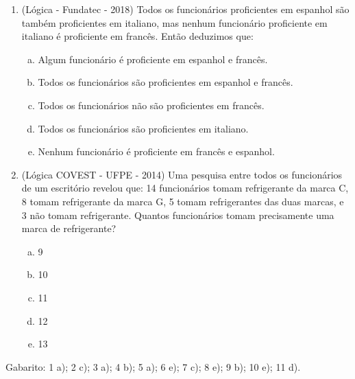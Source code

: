\begin{enumerate}
\item (Lógica - Fundatec - 2018) Todos os funcionários proficientes em espanhol são também proficientes em italiano, mas nenhum funcionário proficiente em italiano é proficiente em francês. Então deduzimos que:
\begin{enumerate}[a)]
\item Algum funcionário é proficiente em espanhol e francês.
\item Todos os funcionários são proficientes em espanhol e francês.
\item Todos os funcionários não são proficientes em francês.
\item Todos os funcionários são proficientes em italiano.
\item Nenhum funcionário é proficiente em francês e espanhol.
\end{enumerate}

\item (Lógica COVEST - UFPE - 2014)  Uma pesquisa entre todos os funcionários de um escritório revelou que: 14 funcionários tomam refrigerante da marca C, 8 tomam refrigerante da marca G, 5 tomam refrigerantes das duas marcas, e 3 não tomam refrigerante. Quantos funcionários tomam precisamente uma marca de refrigerante?
\begin{enumerate}[a)]
\item 9
\item 10
\item 11
\item 12
\item 13
\end{enumerate}

 \end{enumerate}

 Gabarito:
 1 a); 2 c); 3 a); 4 b); 5 a); 6 e); 7 c); 8 e); 9 b); 10 e); 11 d).
